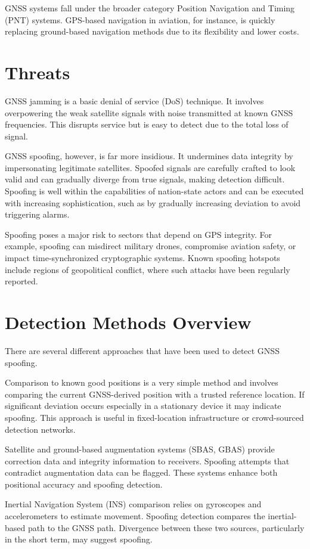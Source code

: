 \documentclass[conference]{IEEEtran}
\begin{document}
GNSS systems fall under the broader category Position Navigation and Timing (PNT) systems. GPS-based navigation in aviation, for instance, is quickly replacing ground-based navigation methods due to its flexibility and lower costs\cite{meng2021}.

\section{Threats}
GNSS jamming is a basic denial of service (DoS) technique. It involves overpowering the weak satellite signals with noise transmitted at known GNSS frequencies. This disrupts service but is easy to detect due to the total loss of signal.

GNSS spoofing, however, is far more insidious. It undermines data integrity by impersonating legitimate satellites. Spoofed signals are carefully crafted to look valid and can gradually diverge from true signals, making detection difficult. Spoofing is well within the capabilities of nation-state actors and can be executed with increasing sophistication, such as by gradually increasing deviation to avoid triggering alarms.

Spoofing poses a major risk to sectors that depend on GPS integrity. For example, spoofing can misdirect military drones, compromise aviation safety, or impact time-synchronized cryptographic systems. Known spoofing hotspots include regions of geopolitical conflict, where such attacks have been regularly reported.

\section{Detection Methods Overview}
There are several different approaches that have been used to detect GNSS spoofing.

Comparison to known good positions is a very simple method and involves comparing the current GNSS-derived position with a trusted reference location. If significant deviation occurs especially in a stationary device it may indicate spoofing. This approach is useful in fixed-location infrastructure or crowd-sourced detection networks.

Satellite and ground-based augmentation systems (SBAS, GBAS) provide correction data and integrity information to receivers. Spoofing attempts that contradict augmentation data can be flagged. These systems enhance both positional accuracy and spoofing detection.

Inertial Navigation System (INS) comparison relies on gyroscopes and accelerometers to estimate movement. Spoofing detection compares the inertial-based path to the GNSS path. Divergence between these two sources, particularly in the short term, may suggest spoofing.
\end{document}
